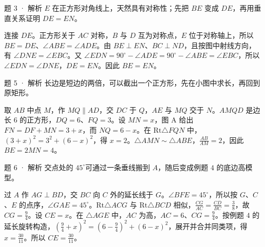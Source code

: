 \begin{solution}{题 3 · 解析}
\think \(E\) 在正方形对角线上，天然具有对称性；先把 \(BE\) 变成 \(DE\)，再用垂直关系证明 \(DE=EN\)。

\diagram{\figFourSolve}
\solve 连接 \(DE\)。正方形关于 \(AC\) 对称，\(B\) 与 \(D\) 互为对称点，\(E\) 位于对称轴上，所以 \(BE=DE\)、\(\angle ABE=\angle ADE\)。由 \(BE\perp EN\)、\(BC\perp ND\)，且按图中射线方向，有 \(\angle DNE=\angle EBC\)。又 \(\angle EDN=90^\circ -\angle ADE=90^\circ -\angle ABE=\angle EBC\)，所以 \(\angle EDN=\angle DNE\)，\(DE=EN\)。因此 \(BE=EN\)。

\end{solution}
\begin{solution}{题 5 · 解析}
\think 长边是短边的两倍，可以截出一个正方形，先在小图中求长，再回到原矩形。

\diagram{\figSixSolve}
\solve 取 \(AB\) 中点 \(M\)，作 \(MQ\parallel AD\)，交 \(DC\) 于 \(Q\)，\(AE\) 与 \(MQ\) 交于 \(N\)。\(AMQD\) 是边长 \(6\) 的正方形，\(DQ=6\)、\(FQ=3\)。设 \(MN=x\)，图 A 给出 \(FN=DF+MN=3+x\)，而 \(NQ=6-x\)。在 \(\mathrm{Rt}\triangle FQN\) 中，\((3+x)^2=3^2+(6-x)^2\)，得 \(x=2\)。\(\triangle AMN\sim \triangle ABE\)，\(\frac{AB}{AM}=2\)，因此 \(BE=2MN=4\)。

\end{solution}
\begin{solution}{题 6 · 解析}
\think 交点处的 \(45^\circ \)可通过一条垂线搬到 \(A\)，随后变成例题 \(4\) 的底边高模型。

\diagram{\figSevenSolve}
\solve 过 \(A\) 作 \(AG\perp BD\)，交 \(BC\) 向 \(C\) 外的延长线于 \(G\)。\(\angle BFE=45^\circ \)，所以按 \(G\)、\(C\)、\(E\) 的点序，\(\angle GAE=45^\circ \)。\(\mathrm{Rt}\triangle ACG\) 与 \(\mathrm{Rt}\triangle BCD\) 相似，\(\frac{CG}{AC}=\frac{CD}{BC}=\frac{3}{8}\)，故 \(CG=\frac{9}{4}\)。设 \(CE=x\)。在 \(\triangle AGE\) 中，\(AC\) 为高，\(AC=6\)、\(CG=\frac{9}{4}\)。按例题 \(4\) 的延长旋转构造，\((\frac{9}{4}+x)^2=(6-\frac{9}{4})^2+(6-x)^2\)，展开并合并同类项，得 \(x=\frac{30}{11}\)。所以 \(CE=\frac{30}{11}\)。

\end{solution}
\clearpage
